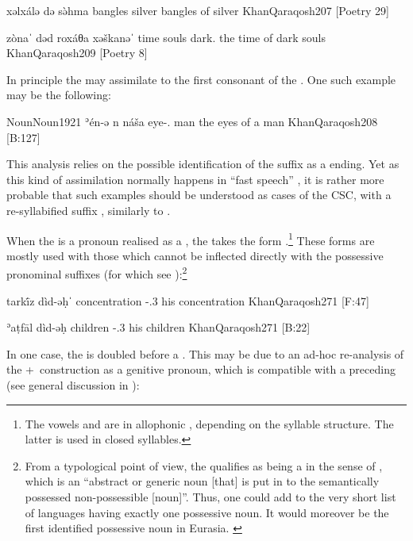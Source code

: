 {xəlxálə də\cb{} sə̀hma}
{bangles \lnk\cb{} silver}
{bangles of silver}
{KhanQaraqosh}{207 {[Poetry 29]}} 

{zònaˈ dəd\cb{} roxáθa xəškanəˈ}
{time \lnk\cb{} souls dark.\pl}
{the time of dark souls}
{KhanQaraqosh}{209 {[Poetry 8]}} 

In principle the \lnk* may assimilate to the first consonant of the \secn. One such example may be the following:

\acex
{Noun}{Noun}{1921}
{ʾén-ə n\cb{} náša}
{eye-\free.\pl{} \lnk\cb{} man}
{the eyes of a man}
{KhanQaraqosh}{208 {[B:127]}}

This analysis relies on the possible identification of  the suffix  as a \pl* {} ending. Yet as this kind of assimilation normally happens in \enquote{fast speech} \citep[208]{KhanQaraqosh}, it is rather more probable that such examples should be understood as cases of the CSC, with a re-syllabified suffix \ed, similarly to  .

\largerpage
When the \secn is a pronoun realised as a , the \lnk* takes the form .\footnote{The vowels \phonetic[i] and \phonetic[ə] are in allophonic , depending on the syllable structure. The latter is used in closed syllables.}
These forms are mostly used with those   which cannot be inflected directly with the possessive pronominal suffixes (for which see ):\footnote{From a typological point of view, the \lnk* qualifies as being a  in the sense of \citet{BickelNicholsWals58}, which is an \enquote{abstract or generic noun [that] is put in  to the semantically possessed non-possessible [\prim noun]}. Thus, one could add \Qar to the very short list of languages having exactly one {possessive noun}. It would moreover be the first identified {possessive noun} in Eurasia. \label{ft:possessive_noun} }



{tarkī́z dìd-əḥˈ}
{concentration \lnk-\poss.3\masc{}}
{his concentration}
{KhanQaraqosh}{271 {[F:47]}}\antipar

\newpage 

{ʾaṭfāl\cb{}  dìd-əḥ}
{children\cb{}  \lnk-\poss.3\masc}
{his children}
{KhanQaraqosh}{271 {[B:22]}}

In one case, the \lnk* is doubled before a . This may be due to an ad-hoc re-analysis of the \lnk+\poss\ construction as a genitive pronoun, which is compatible with a preceding \lnk* (see general discussion in ):

